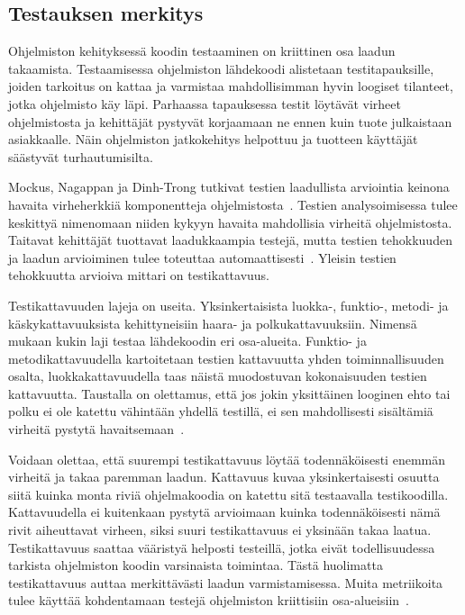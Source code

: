 \documentclass[finnish]{../tktltiki2}
\theoremstyle{definition}
\theoremstyle{remark}
\begin{document}
\subsection{Testauksen merkitys}

Ohjelmiston kehityksessä koodin testaaminen on kriittinen osa laadun takaamista. Testaamisessa ohjelmiston lähdekoodi 
alistetaan testitapauksille, joiden tarkoitus on kattaa ja varmistaa mahdollisimman hyvin loogiset tilanteet, jotka 
ohjelmisto käy läpi. Parhaassa tapauksessa testit löytävät virheet ohjelmistosta ja kehittäjät pystyvät korjaamaan ne 
ennen kuin tuote julkaistaan asiakkaalle. Näin ohjelmiston jatkokehitys helpottuu ja tuotteen käyttäjät säästyvät 
turhautumisilta.

    Mockus, Nagappan ja Dinh-Trong tutkivat testien laadullista arviointia keinona havaita virheherkkiä komponentteja 
ohjelmistosta~\cite{MNDT09}. Testien analysoimisessa tulee keskittyä nimenomaan niiden kykyyn havaita mahdollisia 
virheitä ohjelmistosta. Taitavat kehittäjät tuottavat laadukkaampia testejä, mutta testien tehokkuuden ja laadun 
arvioiminen tulee toteuttaa automaattisesti~\cite{MNDT09}. Yleisin testien tehokkuutta arvioiva mittari on 
testikattavuus.

    Testikattavuuden lajeja on useita. Yksinkertaisista luokka-, funktio-, metodi- ja käskykattavuuksista kehittyneisiin 
haara- ja polkukattavuuksiin. Nimensä mukaan kukin laji testaa lähdekoodin eri osa-alueita. Funktio- ja 
metodikattavuu\-della kartoitetaan testien kattavuutta yhden toiminnallisuuden osalta, luokkakattavuudella taas näistä 
muodostuvan kokonaisuuden testien kattavuutta. Taustalla on olettamus, että jos jokin yksittäinen looginen ehto tai 
polku ei ole katettu vähintään yhdellä testillä, ei sen mahdollisesti sisältämiä virheitä pystytä 
havaitsemaan~\cite{MNDT09}.

    Voidaan olettaa, että suurempi testikattavuus löytää todennäköisesti enemmän virheitä ja takaa paremman laadun. 
Kattavuus kuvaa yksinkertaisesti osuutta siitä kuinka monta riviä ohjelmakoodia on katettu sitä testaavalla 
testikoodilla. Kattavuudella ei kuitenkaan pystytä arvioimaan kuinka todennäköisesti nämä rivit aiheuttavat virheen, 
siksi suuri testikattavuus ei yksinään takaa laatua. Testikattavuus saattaa vääristyä helposti testeillä, jotka eivät 
todellisuudessa tarkista ohjelmiston koodin varsinaista toimintaa. Tästä huolimatta testikattavuus auttaa merkittävästi 
laadun varmistamisessa. Muita metriikoita tulee käyttää kohdentamaan testejä ohjelmiston kriittisiin 
osa-alueisiin~\cite{NB07, MNDT09, YH11}.
\end{document}
